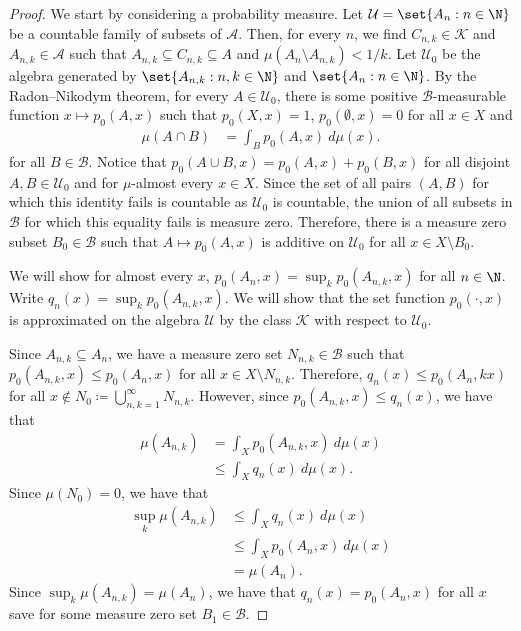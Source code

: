 \documentclass[10pt]{mypackage}
\renewcommand{\coloneq}{\coloneqq}
\begin{document}
\begin{proof}
  We start by considering a probability measure. Let $\mathcal{U} = \set{A_n : n\in \N}$ be a countable family of subsets of $\mathcal{A}$. Then, for every $n$, we find $C_{n,k}\in \mathcal{K}$ and $A_{n,k}\in \mathcal{A}$ such that $A_{n,k}\subseteq C_{n,k}\subseteq A$ and $\mu\left( A_n\setminus A_{n,k} \right) < 1/k$. Let $\mathcal{U}_0$ be the algebra generated by $\set{A_{n,k}: n, k\in \N}$ and $\set{A_n : n\in \N}$. By the Radon--Nikodym theorem, for every $A\in \mathcal{U}_0$, there is some positive $\mathcal{B}$-measurable function $x\mapsto p_0\left( A,x \right)$ such that $p_0\left( X,x \right) = 1$, $p_0\left( \emptyset,x \right) = 0$ for all $x\in X$ and
  \begin{align*}
    \mu\left( A\cap B \right) &= \int_{B}^{} p_0\left( A,x \right)\:d\mu(x).
  \end{align*}
  for all $B\in \mathcal{B}$. Notice that $p_0\left( A\cup B,x \right) = p_0\left( A,x \right) + p_0\left( B,x \right)$ for all disjoint $A,B\in \mathcal{U}_0$ and for $\mu$-almost every $x\in X$. Since the set of all pairs $\left( A,B \right)$ for which this identity fails is countable as $\mathcal{U}_0$ is countable, the union of all subsets in $\mathcal{B}$ for which this equality fails is measure zero. Therefore, there is a measure zero subset $B_0\in \mathcal{B}$ such that $A\mapsto p_0\left( A,x \right)$ is additive on $\mathcal{U}_0$ for all $x\in X\setminus B_0$.

  We will show for almost every $x$, $p_0\left( A_n,x \right) = \sup_{k}p_0\left( A_{n,k},x \right)$ for all $n\in \N$. Write $q_n(x) = \sup_{k}p_0\left( A_{n,k},x \right)$. We will show that the set function $p_0\left( \cdot,x \right)$ is approximated on the algebra $\mathcal{U}$ by the class $\mathcal{K}$ with respect to $\mathcal{U}_0$.

  Since $A_{n,k}\subseteq A_n$, we have a measure zero set $N_{n,k}\in \mathcal{B}$ such that $p_0\left( A_{n,k},x \right)\leq p_0\left( A_n,x \right)$ for all $x\in X\setminus N_{n,k}$. Therefore, $q_n(x)\leq p_0\left( A_n,kx \right)$ for all $x\notin N_0\coloneq \bigcup_{n,k=1}^{\infty}N_{n,k}$. However, since $p_0\left( A_{n,k},x \right)\leq q_n(x)$, we have that
  \begin{align*}
    \mu\left( A_{n,k} \right) &= \int_{X}^{} p_0\left( A_{n ,k},x \right)\:d\mu(x)\\
                              &\leq \int_{X}^{} q_n(x)\:d\mu(x).
  \end{align*}
  Since $\mu\left( N_0 \right) = 0$, we have that
  \begin{align*}
    \sup_{k}\mu\left( A_{n,k} \right) &\leq \int_{X}^{} q_n(x)\:d\mu(x)\\
                                      &\leq \int_{X}^{} p_0\left( A_n,x \right)\:d\mu(x)\\
                                      &= \mu\left( A_n \right).
  \end{align*}
  Since $\sup_{k}\mu\left( A_{n,k} \right) = \mu\left( A_n \right)$, we have that $q_n(x) = p_0\left( A_n,x \right)$ for all $x$ save for some measure zero set $B_1\in \mathcal{B}$.


\end{proof}
\end{document}
